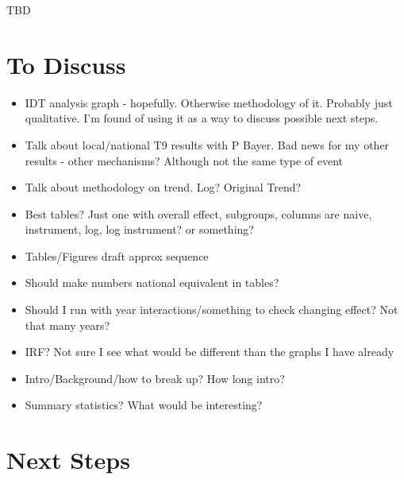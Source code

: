 \documentclass[AER,draftmode]{AEA}
\begin{document}
TBD

\clearpage
\section{To Discuss}

\begin{itemize}
    \item IDT analysis graph - hopefully. Otherwise methodology of it. Probably just qualitative. I'm found of using it as a way to discuss possible next steps.
    \item Talk about local/national T9 results with P Bayer. Bad news for my other results - other mechanisms? Although not the same type of event
    \item Talk about methodology on trend. Log? Original Trend?
    \item Best tables? Just one with overall effect, subgroups, columns are naive, instrument, log, log instrument? or something?
    \item Tables/Figures draft approx sequence
    \item Should make numbers national equivalent in tables? 
    \item Should I run with year interactions/something to check changing effect? Not that many years?
    \item IRF? Not sure I see what would be different than the graphs I have already
    \item Intro/Background/how to break up? How long intro?
    \item Summary statistics? What would be interesting?
\end{itemize}


\clearpage 
\section{Next Steps}
\end{document}
